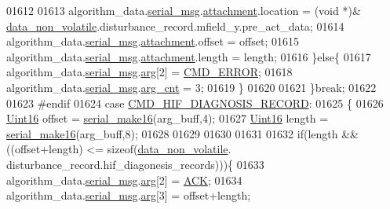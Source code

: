 \begin{DoxyCode}
{{{{{01612 
01613                        algorithm\_data.\hyperlink{a00016_afcf5f557aea688aad985eec15269c1da}{serial\_msg}.\hyperlink{a00031_a040f6d5d58d18d8aeaf447eda7f50172}{attachment}.location    = (\textcolor{keywordtype}{void} *)&
      \hyperlink{a00060_a76ac5f917f5308dcd83de0d7c94559fb}{data\_non\_volatile}.disturbance\_record.mfield\_y.pre\_act\_data;
01614                        algorithm\_data.\hyperlink{a00016_afcf5f557aea688aad985eec15269c1da}{serial\_msg}.\hyperlink{a00031_a040f6d5d58d18d8aeaf447eda7f50172}{attachment}.offset      = offset;
01615                        algorithm\_data.\hyperlink{a00016_afcf5f557aea688aad985eec15269c1da}{serial\_msg}.\hyperlink{a00031_a040f6d5d58d18d8aeaf447eda7f50172}{attachment}.length      = length;
01616                      \}\textcolor{keywordflow}{else}\{
01617                          algorithm\_data.\hyperlink{a00016_afcf5f557aea688aad985eec15269c1da}{serial\_msg}.\hyperlink{a00031_af7d6f762438c80072bd9dc0e4dd4ae1e}{arg}[2]               = 
      \hyperlink{a00021_a1764a522e9c1a59a59be8757c69fa494}{CMD\_ERROR};
01618                          algorithm\_data.\hyperlink{a00016_afcf5f557aea688aad985eec15269c1da}{serial\_msg}.\hyperlink{a00031_a7b79f40e2eeec288091afd340bf8f591}{arg\_cnt}              = 3;
01619                      \}
01620 
01621                 \}\textcolor{keywordflow}{break};
01622 
01623 \textcolor{preprocessor}{#endif}
01624                  \textcolor{keywordflow}{case}  \hyperlink{a00021_a185ed5442d69c7c8abba13323a8e8187}{CMD\_HIF\_DIAGNOSIS\_RECORD}:
01625                 \{
01626                     \hyperlink{a00072_a59a9f6be4562c327cbfb4f7e8e18f08b}{Uint16} offset = \hyperlink{a00031_abc17de32f14103a5be219df0d4ad9176}{serial\_make16}(arg\_buff,4);
01627                     \hyperlink{a00072_a59a9f6be4562c327cbfb4f7e8e18f08b}{Uint16} length = \hyperlink{a00031_abc17de32f14103a5be219df0d4ad9176}{serial\_make16}(arg\_buff,8);
01628 
01629 
01630 
01631 
01632                      \textcolor{keywordflow}{if}(length && ((offset+length) <= \textcolor{keyword}{sizeof}(\hyperlink{a00060_a76ac5f917f5308dcd83de0d7c94559fb}{data\_non\_volatile}.
      disturbance\_record.hif\_diagonesis\_records)))\{
01633                        algorithm\_data.\hyperlink{a00016_afcf5f557aea688aad985eec15269c1da}{serial\_msg}.\hyperlink{a00031_af7d6f762438c80072bd9dc0e4dd4ae1e}{arg}[2]                 = 
      \hyperlink{a00021_a6f6489887e08bff4887d0bc5dcf214d8}{ACK};
01634                        algorithm\_data.\hyperlink{a00016_afcf5f557aea688aad985eec15269c1da}{serial\_msg}.\hyperlink{a00031_af7d6f762438c80072bd9dc0e4dd4ae1e}{arg}[3]                 = offset+length;
}}}}}
\end{DoxyCode}
